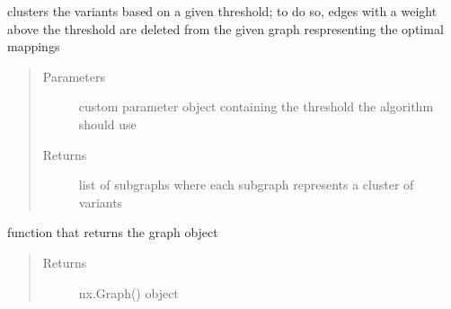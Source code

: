 \documentclass[letterpaper,10pt,english]{sphinxmanual}
\begin{document}
\begin{fulllineitems}
\begin{fulllineitems}
\begin{quote}
\begin{description}
\end{description}\end{quote}

\end{fulllineitems}


\begin{fulllineitems}
\label{\detokenize{graph:graph.graphTool.graphTool.clusterDetection}}
clusters the variants based on a given threshold; to do so, edges with a weight above the threshold are deleted from the given graph respresenting the optimal mappings
\begin{quote}\begin{description}
\item[{Parameters}] \leavevmode
{} \textendash{} custom parameter object containing the threshold the algorithm should use

\item[{Returns}] \leavevmode
list of subgraphs where each subgraph represents a cluster of variants

\end{description}\end{quote}

\end{fulllineitems}


\begin{fulllineitems}
\label{\detokenize{graph:graph.graphTool.graphTool.getGraph}}
function that returns the graph object
\begin{quote}\begin{description}
\item[{Returns}] \leavevmode
nx.Graph() object

\end{description}\end{quote}

\end{fulllineitems}



\end{fulllineitems}
\end{document}
